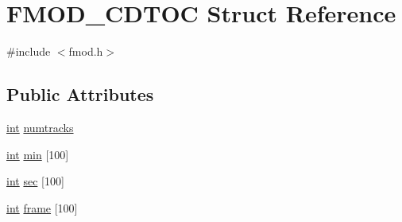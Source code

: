 \hypertarget{struct_f_m_o_d___c_d_t_o_c}{\section{F\-M\-O\-D\-\_\-\-C\-D\-T\-O\-C Struct Reference}
\label{struct_f_m_o_d___c_d_t_o_c}
}


{\ttfamily \#include $<$fmod.\-h$>$}

\subsection*{Public Attributes}
\begin{DoxyCompactItemize}
\item 
\hyperlink{wglew_8h_a500a82aecba06f4550f6849b8099ca21}{int} \hyperlink{struct_f_m_o_d___c_d_t_o_c_aad0a3526919d1d67958c47179a73cf7b}{numtracks}
\item 
\hyperlink{wglew_8h_a500a82aecba06f4550f6849b8099ca21}{int} \hyperlink{struct_f_m_o_d___c_d_t_o_c_ac32672636e86e7d5da6cd02737123f0e}{min} \mbox{[}100\mbox{]}
\item 
\hyperlink{wglew_8h_a500a82aecba06f4550f6849b8099ca21}{int} \hyperlink{struct_f_m_o_d___c_d_t_o_c_a20dcf991841f7f4322904f9a1175e7c6}{sec} \mbox{[}100\mbox{]}
\item 
\hyperlink{wglew_8h_a500a82aecba06f4550f6849b8099ca21}{int} \hyperlink{struct_f_m_o_d___c_d_t_o_c_a40e8bdc25c765a02c4ca0af13c74dc5f}{frame} \mbox{[}100\mbox{]}
\end{DoxyCompactItemize}


